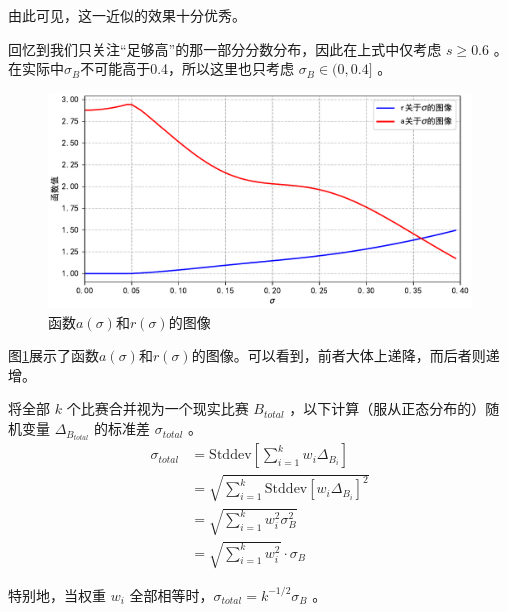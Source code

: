             由此可见，这一近似的效果十分优秀。
            
            回忆到我们只关注“足够高”的那一部分分数分布，因此在上式中仅考虑 $s\geq 0.6$ 。在实际中$\sigma_B$不可能高于0.4，所以这里也只考虑 $\sigma_B\in (0,0.4]$ 。

            \begin{figure}[htbp]
                \centering
                \includegraphics[width=\textwidth]{fig/plottingAandR.pdf}
                \caption{函数$a(\sigma)$和$r(\sigma)$的图像}
                \label{fig:plottingAandR}
            \end{figure}

            图\ref{fig:plottingAandR}展示了函数$a(\sigma)$和$r(\sigma)$的图像。可以看到，前者大体上递降，而后者则递增。

            \vspace{1.5ex}

            将全部 $k$ 个比赛合并视为一个现实比赛 $B_{\textit{total}}$ ，以下计算（服从正态分布的）随机变量 $\Delta_{B_{\textit{total}}}$ 的标准差 $\sigma_{\textit{total}}$ 。
            \begin{align*}
                \sigma_{\textit{total}}
                &=\mathrm{Stddev}\left[\sum\limits_{i=1}^k w_i\Delta_{B_i}\right] \\
                &=\sqrt{\sum\limits_{i=1}^k \mathrm{Stddev}\left[w_i\Delta_{B_i}\right]^2} \\
                &=\sqrt{\sum\limits_{i=1}^k w_i^2\sigma_B^2} \\
                &=\sqrt{\sum\limits_{i=1}^k w_i^2}\cdot\sigma_B
            \end{align*}

            特别地，当权重 $w_i$ 全部相等时，$\sigma_{\textit{total}}=k^{-1/2}\sigma_B$ 。

            \vspace{1.5ex}


